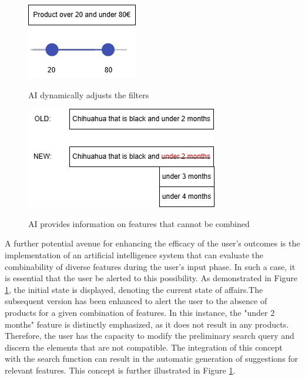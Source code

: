 \documentclass[../../submission.tex]{subfiles}
\begin{document}
\begin{figure}[h]
    \centering
    \begin{minipage}{0.35\textwidth}
        \includegraphics[width=\textwidth]{images/filter}
        \caption{AI dynamically adjusts the filters}
        \Description{}
        \label{fig:filter}
    \end{minipage}
    \hfill
    \begin{minipage}{0.55\textwidth}
        \includegraphics[width=\textwidth]{images/vorschlag}
        \caption{AI provides information on features that cannot be combined}
        \Description{}
        \label{fig:suggestions}
    \end{minipage}
\end{figure}
A further potential avenue for enhancing the efficacy of the user's 
outcomes is the implementation of an artificial intelligence system that can 
evaluate the combinability of diverse features during the user's input phase. 
In such a case, it is essential that the user be alerted to this possibility. 
As demonstrated in Figure \ref{fig:suggestions}, the initial state is displayed, denoting the current 
state of affairs.The subsequent version has been enhanced to alert the user to the 
absence of products for a given combination of features. In this instance, the 
"under 2 months" feature is distinctly emphasized, as it does not result in any products. 
Therefore, the user has the capacity to modify the preliminary search query and discern the 
elements that are not compatible. The integration of this concept with the search function 
can result in the automatic generation of suggestions for relevant features. This concept is 
further illustrated in Figure \ref{fig:suggestions}.
\end{document}
